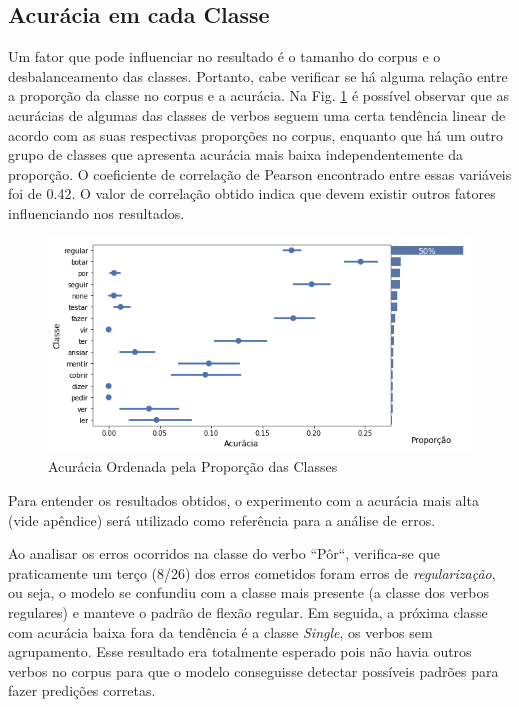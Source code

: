 \subsection{Acurácia em cada Classe}
\label{sec:prop}

Um fator que pode influenciar no resultado é o tamanho do corpus e o desbalanceamento das classes. Portanto, cabe verificar se há alguma relação entre a proporção da classe no corpus e a acurácia. Na Fig. \ref{fig:kfoldprop} é possível observar que as acurácias de algumas das classes de verbos seguem uma certa tendência linear de acordo com as suas respectivas proporções no corpus, enquanto que há um outro grupo de classes que apresenta acurácia mais baixa independentemente da proporção. O coeficiente de correlação de Pearson encontrado entre essas variáveis foi de 0.42. O valor de correlação obtido indica que devem existir outros fatores influenciando nos resultados.

\begin{figure}[H]
  \centering
  \includegraphics[width=0.8\linewidth]{img/proporxacc.png}
  \caption{Acurácia Ordenada pela Proporção das Classes}
  \label{fig:kfoldprop}
\end{figure}

Para entender os resultados obtidos, o experimento com a acurácia mais alta (vide apêndice) será utilizado como referência para a análise de erros.

Ao analisar os erros ocorridos na classe do verbo “Pôr“, verifica-se que praticamente um terço (8/26) dos erros cometidos foram erros de \textit{regularização}, ou seja, o modelo se confundiu com a classe mais presente (a classe dos verbos regulares) e manteve o padrão de flexão regular. 
Em seguida, a próxima classe com acurácia baixa fora da tendência é a classe \textit{Single}, os verbos sem agrupamento. Esse resultado era totalmente esperado pois não havia outros verbos no corpus para que o modelo conseguisse detectar possíveis padrões para fazer predições corretas. 

